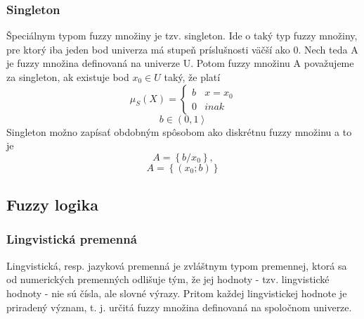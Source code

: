 \subsubsection{Singleton}
Špeciálnym typom fuzzy množiny je tzv. singleton. Ide o taký typ fuzzy množiny, pre ktorý iba jeden bod univerza má stupeň príslušnosti väčší ako 0. 
Nech teda A je fuzzy množina definovaná na univerze U. Potom fuzzy množinu A považujeme za singleton, ak existuje bod $x_0 \in U$ taký, že platí \cite{gregorUI} 
\begin{equation}\label{singleton0}
\mu_S (X) = 
\begin{cases}
b &  x = x_0 \\
0 &  inak
\end{cases}
\end{equation}
 $$ b \in \left(  0, 1 \right\rangle $$
Singleton možno zapísať obdobným spôsobom ako diskrétnu fuzzy množinu a to je \cite{gregorUI} 
\begin{equation}\label{singleton1}
A = \left\lbrace b/x_0 \right\rbrace , 
\end{equation}
\begin{equation}\label{singleton2}
A = \left\lbrace \left( x_0 ; b \right) \right\rbrace 
\end{equation}

\subsection{Fuzzy logika}
\subsubsection{Lingvistická premenná}
Lingvistická, resp. jazyková premenná je zvláštnym typom premennej, ktorá sa od numerických premenných odlišuje tým, že jej hodnoty - tzv. lingvistické hodnoty - nie sú čísla, ale slovné výrazy. Pritom každej lingvistickej hodnote je priradený význam, t. j. určitá fuzzy množina definovaná na spoločnom univerze. \cite{gregorUI}

